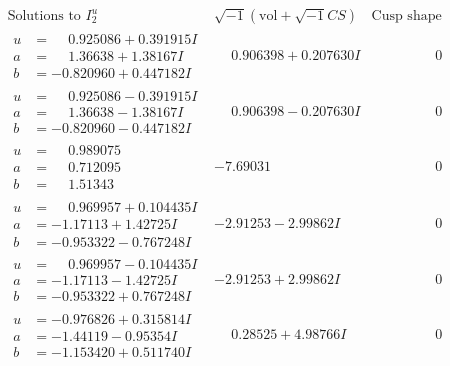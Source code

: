 \documentclass[1p]{elsarticle_modified}
\theoremstyle{definition}
\newcommand{\I}{\sqrt{-1}}
\begin{document}
$$\begin{array}{c|c|c}  
\text{Solutions to }I^u_{2}& \I (\text{vol} + \sqrt{-1}CS) & \text{Cusp shape}\\
 \hline 
\begin{aligned}
u &= \phantom{-}0.925086 + 0.391915 I \\
a &= \phantom{-}1.36638 + 1.38167 I \\
b &= -0.820960 + 0.447182 I\end{aligned}
 & \phantom{-}0.906398 + 0.207630 I & \phantom{-0.000000 } 0 \\ \hline\begin{aligned}
u &= \phantom{-}0.925086 - 0.391915 I \\
a &= \phantom{-}1.36638 - 1.38167 I \\
b &= -0.820960 - 0.447182 I\end{aligned}
 & \phantom{-}0.906398 - 0.207630 I & \phantom{-0.000000 } 0 \\ \hline\begin{aligned}
u &= \phantom{-}0.989075\phantom{ +0.000000I} \\
a &= \phantom{-}0.712095\phantom{ +0.000000I} \\
b &= \phantom{-}1.51343\phantom{ +0.000000I}\end{aligned}
 & -7.69031\phantom{ +0.000000I} & \phantom{-0.000000 } 0 \\ \hline\begin{aligned}
u &= \phantom{-}0.969957 + 0.104435 I \\
a &= -1.17113 + 1.42725 I \\
b &= -0.953322 - 0.767248 I\end{aligned}
 & -2.91253 - 2.99862 I & \phantom{-0.000000 } 0 \\ \hline\begin{aligned}
u &= \phantom{-}0.969957 - 0.104435 I \\
a &= -1.17113 - 1.42725 I \\
b &= -0.953322 + 0.767248 I\end{aligned}
 & -2.91253 + 2.99862 I & \phantom{-0.000000 } 0 \\ \hline\begin{aligned}
u &= -0.976826 + 0.315814 I \\
a &= -1.44119 - 0.95354 I \\
b &= -1.153420 + 0.511740 I\end{aligned}
 & \phantom{-}0.28525 + 4.98766 I & \phantom{-0.000000 } 0 \\ \hline\begin{aligned}

\end{aligned}
\end{array}$$
\end{document}
